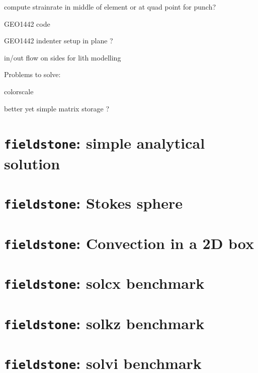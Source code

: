 \documentclass[a4paper]{article}
\begin{document}
compute strainrate in middle of element or at quad point for punch?

GEO1442 code 

GEO1442 indenter setup in plane ?

in/out flow on sides for lith modelling

\noindent Problems to solve:

colorscale 

better yet simple matrix storage ?


\newpage
\section{{\tt fieldstone}: simple analytical solution \label{f1}}


\newpage
\section{{\tt fieldstone}: Stokes sphere }


\newpage
\section{{\tt fieldstone}: Convection in a 2D box}


\newpage
\section{{\tt fieldstone}: solcx benchmark}


\newpage
\section{{\tt fieldstone}: solkz benchmark}


\newpage
\section{{\tt fieldstone}: solvi benchmark}

\end{document}
